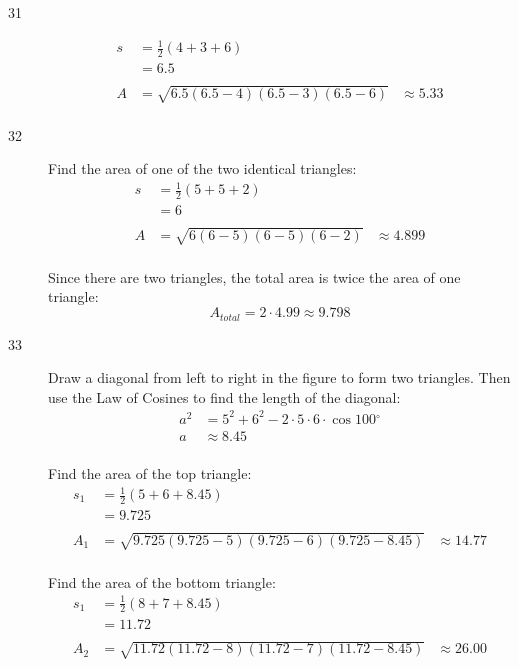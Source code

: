 \documentclass{exam}
\newcommand{\dg}{\ensuremath{^\circ}}
\begin{document}
\begin{description}
      \item[31]
        \begin{align*}
          s  & = \frac{1}{2}(4 + 3 + 6) \\
             & = 6.5 \\
          \\
          A  & = \sqrt{6.5 (6.5 - 4)(6.5 - 3) (6.5 - 6)}
             & \approx \boxed{ 5.33 } \\
        \end{align*}

      \item[32]
        Find the area of one of the two identical triangles:
        \begin{align*}
          s  & = \frac{1}{2}(5 + 5 + 2) \\
             & = 6 \\
          \\
          A  & = \sqrt{6 (6 - 5)(6 - 5) (6 - 2)}
             & \approx 4.899 \\
        \end{align*}

        Since there are two triangles, the total area is twice the area of one triangle: 
        \[
          A_{total} = 2 \cdot 4.99 \approx \boxed{ 9.798 }
        \]

      \item[33]
        Draw a diagonal from left to right in the figure to form two triangles.  Then use the Law of Cosines to find the
        length of the diagonal:
        \begin{align*}
          a^2 & = 5^2 + 6^2 - 2 \cdot 5 \cdot 6 \cdot \cos 100 \dg \\
          a   & \approx 8.45 \\
        \end{align*}

        Find the area of the top triangle:
        \begin{align*}
          s_1 & = \frac{1}{2}(5 + 6 + 8.45) \\
              & = 9.725 \\
          \\
          A_1 & = \sqrt{9.725 (9.725 - 5)(9.725 - 6) (9.725 - 8.45)}
              & \approx \boxed{ 14.77 } \\
        \end{align*}

        Find the area of the bottom triangle:
        \begin{align*}
          s_1 & = \frac{1}{2}(8 + 7 + 8.45) \\
              & = 11.72 \\
          \\
          A_2 & = \sqrt{11.72 (11.72 - 8)(11.72 - 7) (11.72 - 8.45)}
              & \approx 26.00 \\
        \end{align*}


\end{description}
\end{document}
